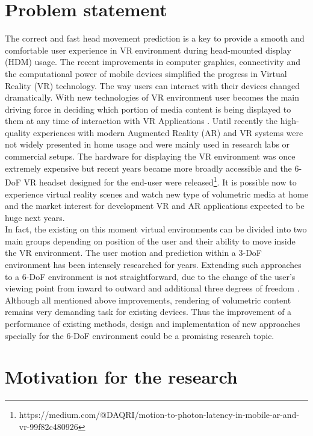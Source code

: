 \section{Problem statement}
\label{sec:intro:problem}
The correct and fast head movement prediction is a key to provide a smooth and comfortable user experience in VR environment during head-mounted display (HDM) usage. The recent improvements in computer graphics, connectivity and the computational power of mobile devices simplified the progress in Virtual Reality (VR) technology. The way users can interact with their devices changed dramatically. With new technologies of VR environment user becomes the main driving force in deciding which portion of media content is being displayed to them at any time of interaction with VR Applications \cite{new_challenge}. Until recently the high-quality experiences with modern Augmented Reality (AR) and VR systems were not widely presented in home usage and were mainly used in research labs or commercial setups. The hardware for displaying the VR environment was once extremely expensive but recent years became more broadly accessible and the 6-DoF VR headset designed for the end-user were released\footnote{https://medium.com/@DAQRI/motion-to-photon-latency-in-mobile-ar-and-vr-99f82c480926}. It is possible now to experience virtual reality scenes and watch new type of volumetric media at home and the market interest for development VR and AR applications expected to be huge next years.\\
In fact, the existing on this moment virtual environments can be divided into two main groups depending on position of the user and their ability to move inside the VR environment. The user motion and prediction within a 3-DoF environment has been intensely researched for years. Extending such approaches to a 6-DoF environment is not straightforward, due to the change of the user's viewing point from inward to outward and additional three degrees of freedom \cite{6-dof_metrics}.\\
Although all mentioned above improvements, rendering of volumetric content remains very demanding task for existing devices. Thus the improvement of a performance of existing methods, design and implementation of new approaches specially for the 6-DoF environment could be a promising research topic.

\section{Motivation for the research}
\label{sec:intro:motivation}

